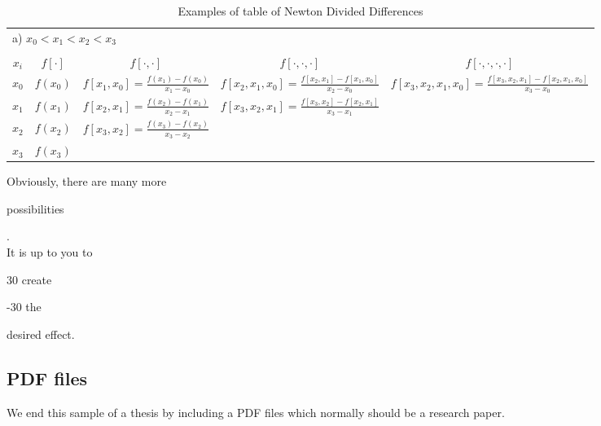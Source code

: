 \begin{table}
\hspace*{-3em}   %
\begin{tabular}{ccccc}
\multicolumn{5}{l}{a) $x_0 < x_1 <x_2 < x_3$} \\
&&&&\\
$\displaystyle x_i$ & $\displaystyle f[\cdot] $ &
$\displaystyle f[\cdot,\cdot]$ &
$\displaystyle f[\cdot,\cdot,\cdot]$ &
$\displaystyle f[\cdot,\cdot,\cdot,\cdot]$ \\
\hline
\rule{0em}{2em} $\displaystyle x_0$ & \multicolumn{1}{|c}{$\displaystyle
  f(x_0)$} &
\multicolumn{1}{|c}{$\displaystyle f[x_1,x_0] =
  \frac{f(x_1)-f(x_0)}{x_1-x_0}$} &
\multicolumn{1}{|c}{$\displaystyle
  f[x_2,x_1,x_0]=\frac{f[x_2,x_1]-f[x_1,x_0]}{x_2-x_0}$} &
\multicolumn{1}{|c|}{$\displaystyle f[x_3,x_2,x_1,x_0] =
\frac{f[x_3,x_2,x_1]-f[x_2,x_1,x_0]}{x_3-x_0}$} \\[1em]
\cline{2-5}
\rule{0em}{2em} $\displaystyle x_1$ & $\displaystyle f(x_1)$ &
$\displaystyle f[x_2,x_1] = \frac{f(x_2)-f(x_1)}{x_2-x_1}$ &
$\displaystyle f[x_3,x_2,x_1] = \frac{f[x_3,x_2]-f[x_2,x_1]}{x_3-x_1}$
& \\[1em]
\rule{0em}{2em} $\displaystyle x_2$ & $\displaystyle f(x_2)$ &
$\displaystyle f[x_3,x_2] = \frac{f(x_3)-f(x_2)}{x_3-x_2}$ & & \\[1em]
$\displaystyle x_3$ & $\displaystyle f(x_3)$ & & &
\end{tabular}
\caption{Examples of table of Newton Divided Differences\label{TTBB2}}
\end{table}

Obviously, there are many more \begin{turn}{30}
  possibilities \end{turn}.\\[2em]
It is up to you to \begin{rotate}{30} create \end{rotate} \hspace{1em}
\begin{rotate}{-30} the \end{rotate} \hspace{1em} desired effect.

\newpage

\subsection{PDF files}

We end this sample of a thesis by including a PDF files which normally
should be a research paper.





